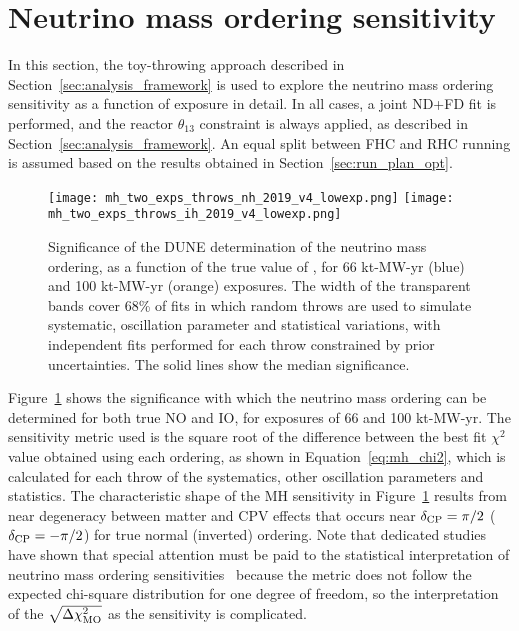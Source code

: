 \section{Neutrino mass ordering sensitivity}
\label{sec:mh_sens}

In this section, the toy-throwing approach described in Section~\ref{sec:analysis_framework} is used to explore the neutrino mass ordering sensitivity as a function of exposure in detail. In all cases, a joint ND+FD fit is performed, and the reactor $\theta_{13}$ constraint is always applied, as described in Section~\ref{sec:analysis_framework}. An equal split between FHC and RHC running is assumed based on the results obtained in Section~\ref{sec:run_plan_opt}.

\begin{figure}[htbp]
  \centering
  \texttt{[image: mh\_two\_exps\_throws\_nh\_2019\_v4\_lowexp.png]}
  \texttt{[image: mh\_two\_exps\_throws\_ih\_2019\_v4\_lowexp.png]}
  \caption{Significance of the DUNE determination of the neutrino mass ordering, as a function of the true value of \deltacp, for 66 kt-MW-yr (blue) and 100 kt-MW-yr (orange) exposures. The width of the transparent bands cover 68\% of fits in which random throws are used to simulate systematic, oscillation parameter and statistical variations, with independent fits performed for each throw constrained by prior uncertainties. The solid lines show the median significance.}
  \label{fig:mh_bands}
\end{figure}
Figure~\ref{fig:mh_bands} shows the significance with which the neutrino mass ordering can be determined for both true NO and IO, for exposures of 66 and 100 kt-MW-yr. The sensitivity metric used is the square root of the difference between the best fit $\chi^{2}$ value obtained using each ordering, as shown in Equation~\ref{eq:mh_chi2}, which is calculated for each throw of the systematics, other oscillation parameters and statistics. The characteristic shape of the MH sensitivity in Figure~\ref{fig:mh_bands} results from near degeneracy between matter and CPV effects that occurs near $\delta_{\rm CP}=\pi/2$ ($\delta_{\rm CP}=-\pi/2$) for true normal (inverted) ordering. Note that dedicated studies have shown that special attention must be paid to the statistical interpretation of neutrino mass ordering sensitivities~\cite{Ciuffoli:2013rza,Qian:2012zn,Blennow:2013oma} because the \dchisqMO metric does not follow the expected chi-square distribution for one degree of freedom, so the interpretation of the $\sqrt{\Delta\chi^{2}_{\mathrm{MO}}}$ as the sensitivity is complicated.

